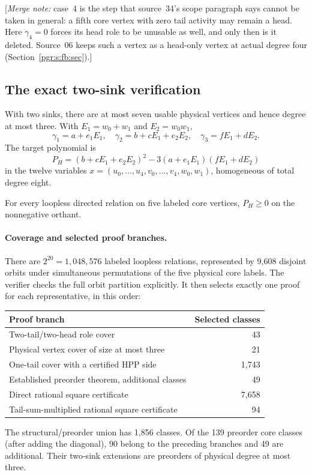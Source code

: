 \documentclass[11pt]{article}
\numberwithin{equation}{section}
\theoremstyle{definition}\newtheorem{definition}[theorem]{Definition}\newtheorem{remark}[theorem]{Remark}
\newcommand{\mnote}[1]{[\textit{Merge note:} #1]}
\begin{document}
\mnote{case~4 is the step that source~34's scope paragraph says cannot be
taken in general: a fifth core vertex with zero tail activity may remain a
head. Here $\gamma_4=0$ forces its head role to be unusable as well, and
only then is it deleted. Source~06 keeps such a vertex as a head-only
vertex at actual degree four (Section~\ref{pgr:s:fb:sec}).}

\subsection{The exact two-sink verification}
With two sinks, there are at most seven usable physical vertices and hence degree at most three. With $E_1=w_0+w_1$ and $E_2=w_0w_1$,
\[
 \gamma_1=a+e_1E_1,\quad\gamma_2=b+cE_1+e_2E_2,\quad\gamma_3=fE_1+dE_2.
\]
The target polynomial is
\begin{equation}\label{pgr:s:fq:eq:target}
 P_H=(b+cE_1+e_2E_2)^2-3(a+e_1E_1)(fE_1+dE_2)
\end{equation}
in the twelve variables $x=(u_0,\ldots,u_4,v_0,\ldots,v_4,w_0,w_1)$, homogeneous of total degree eight.

\begin{lemma}\label{pgr:s:fq:lem:finite}
For every loopless directed relation on five labeled core vertices, $P_H\ge0$ on the nonnegative orthant.
\end{lemma}

\paragraph{Coverage and selected proof branches.}
There are $2^{20}=1,048,576$ labeled loopless relations, represented by 9,608 disjoint orbits under simultaneous permutations of the five physical core labels. The verifier checks the full orbit partition explicitly. It then selects exactly one proof for each representative, in this order:
\begin{center}
\begin{tabular}{lr}
\toprule
Proof branch&Selected classes\\
\midrule
Two-tail/two-head role cover&43\\
Physical vertex cover of size at most three&21\\
One-tail cover with a certified HPP side&1,743\\
Established preorder theorem, additional classes&49\\
Direct rational square certificate&7,658\\
Tail-sum-multiplied rational square certificate&94\\
\bottomrule
\end{tabular}
\end{center}
The structural/preorder union has 1,856 classes. Of the 139 preorder core classes (after adding the diagonal), 90 belong to the preceding branches and 49 are additional. Their two-sink extensions are preorders of physical degree at most three.
\end{document}
